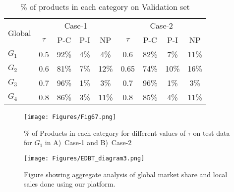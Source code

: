 \renewcommand{\arraystretch}{}
\begin{table}
  {%
  \centering
  \begin{tabular}{|p{0.7cm}|c|c|c|c|c|c|c|c|}
    \hline
    \multirow{2}{*}{Global} &
      \multicolumn{4}{c|}{Case-1} &
      \multicolumn{4}{c|}{Case-2} \\
      \cline{2-9}
    & $\tau$ & P-C & P-I & NP & $\tau$ & P-C & P-I & NP \\
   \hline
   $G_1$ & 0.5 & 92\% & 4\% & 4\% & 0.6 & 82\% & 7\% & 11\% \\
   \hline
   $G_2$ & 0.6 & 81\% & 7\% & 12\% & 0.65 & 74\% & 10\% & 16\% \\
   \hline
   $G_3$ & 0.7 & 96\% & 1\% & 3\% & 0.7 & 96\% & 1\% & 3\% \\
   \hline
   $G_4$ & 0.8 & 86\% & 3\% & 11\% & 0.8 & 85\% & 4\% & 11\% \\
   \hline
  \end{tabular}
  \scriptsize
  \caption{\% of products in each category on Validation set}
  \label{table:categories}
  }
\end{table}

\begin{figure}[!t]
\centering
\texttt{[image: Figures/Fig67.png]}
\caption{\% of Products in each category for different values of $\tau$ on test data for $G_1$ in A)~Case-1 and	 B)~Case-2}
\label{fig:PC-2}
\end{figure}
\begin{figure}
\centering
\texttt{[image: Figures/EDBT\_diagram3.png]}
\caption{Figure showing aggregate analysis of global market share and local sales done using our platform. }
\label{fig:iFuse}
\end{figure}

